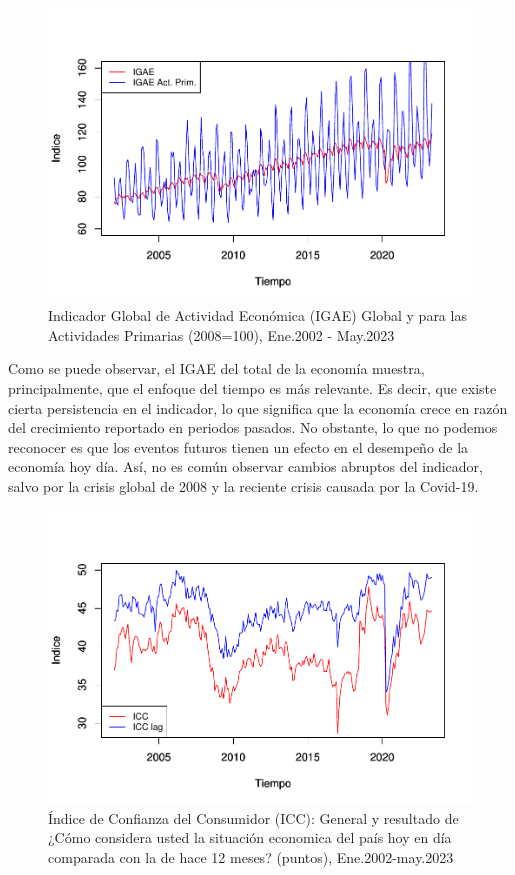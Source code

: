 \documentclass[
]{book}
\begin{document}
\begin{figure}

{\centering \includegraphics{bookdown-demo_files/figure-latex/fig1-1} 

}

\caption{Indicador Global de Actividad Económica (IGAE) Global y para las Actividades Primarias (2008=100), Ene.2002 - May.2023}\label{fig:fig1}
\end{figure}

Como se puede observar, el IGAE del total de la economía muestra, principalmente, que el enfoque del tiempo es más relevante. Es decir, que existe cierta persistencia en el indicador, lo que significa que la economía crece en razón del crecimiento reportado en periodos pasados. No obstante, lo que no podemos reconocer es que los eventos futuros tienen un efecto en el desempeño de la economía hoy día. Así, no es común observar cambios abruptos
del indicador, salvo por la crisis global de 2008 y la reciente crisis causada
por la Covid-19.

\begin{figure}

{\centering \includegraphics{bookdown-demo_files/figure-latex/fig2-1} 

}

\caption{Índice de Confianza del Consumidor (ICC): General y resultado de ¿Cómo considera usted la situación economica del país hoy en día comparada con la de hace 12 meses? (puntos), Ene.2002-may.2023}\label{fig:fig2}
\end{figure}
\end{document}
